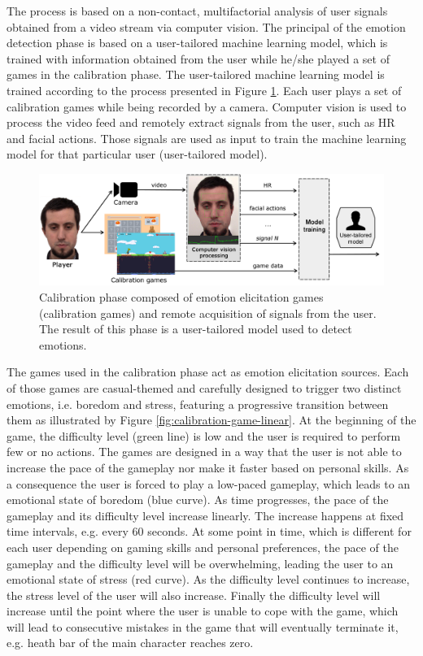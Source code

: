 The process is based on a non-contact, multifactorial analysis of user signals obtained from a video stream via computer vision. The principal of the emotion detection phase is based on a user-tailored machine learning model, which is trained with information obtained from the user while he/she played a set of games in the calibration phase. The user-tailored machine learning model is trained according to the process presented in Figure \ref{fig:user-tailored-calibration}. Each user plays a set of calibration games while being recorded by a camera. Computer vision is used to process the video feed and remotely extract signals from the user, such as HR and facial actions. Those signals are used as input to train the machine learning model for that particular user (user-tailored model).

\begin{figure}[h]
    \centering
    \includegraphics[width=\textwidth]{Content/figures/user-tailored-calibration.png}
    \caption{Calibration phase composed of emotion elicitation games (calibration games) and remote acquisition of signals from the user. The result of this phase is a user-tailored model used to detect emotions.}
    \label{fig:user-tailored-calibration}
\end{figure}

The games used in the calibration phase act as emotion elicitation sources. Each of those games are casual-themed and carefully designed to trigger two distinct emotions, i.e. boredom and stress, featuring a progressive transition between them as illustrated by Figure \ref{fig:calibration-game-linear}. At the beginning of the game, the difficulty level (green line) is low and the user is required to perform few or no actions. The games are designed in a way that the user is not able to increase the pace of the gameplay nor make it faster based on personal skills. As a consequence the user is forced to play a low-paced gameplay, which leads to an emotional state of boredom (blue curve). As time progresses, the pace of the gameplay and its difficulty level increase linearly. The increase happens at fixed time intervals, e.g. every 60 seconds. At some point in time, which is different for each user depending on gaming skills and personal preferences, the pace of the gameplay and the difficulty level will be overwhelming, leading the user to an emotional state of stress (red curve). As the difficulty level continues to increase, the stress level of the user will also increase. Finally the difficulty level will increase until the point where the user is unable to cope with the game, which will lead to consecutive mistakes in the game that will eventually terminate it, e.g. heath bar of the main character reaches zero.

